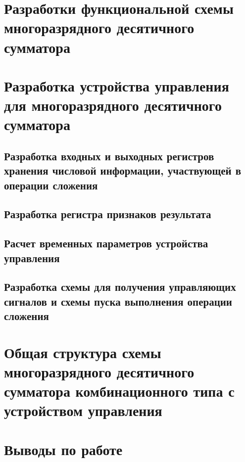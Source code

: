 \documentclass[a4paper,14pt]{article}
\begin{document}
\section{Разработки функциональной схемы многоразрядного десятичного сумматора}

\section{Разработка устройства управления для многоразрядного десятичного сумматора}

\subsection{Разработка входных и выходных регистров хранения числовой информации, участвующей в операции сложения}

\subsection{Разработка регистра признаков результата}

\subsection{Расчет временных параметров устройства управления}

\subsection{Разработка схемы для получения управляющих сигналов и схемы пуска выполнения операции сложения}

\section{Общая структура схемы многоразрядного десятичного сумматора комбинационного типа с устройством управления}

\section{Выводы по работе}
\end{document}
